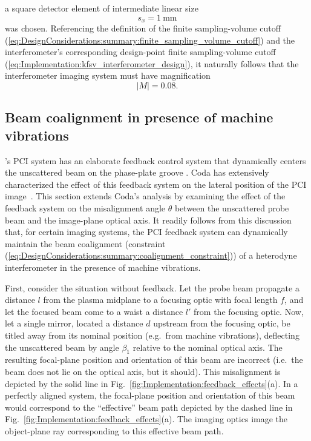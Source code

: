 a square detector element of intermediate linear size
\begin{equation}
  s_x = \SI{1}{\milli\meter}
  \label{eq:Implementation:detector_size}
\end{equation}
was chosen.
Referencing the definition of the finite sampling-volume cutoff
(\ref{eq:DesignConsiderations:summary:finite_sampling_volume_cutoff}) and
the interferometer's corresponding design-point
finite sampling-volume cutoff
(\ref{eq:Implementation:kfsv_interferometer_design}),
it naturally follows that the interferometer imaging system
must have magnification
\begin{equation}
  |M| = 0.08.
  \label{eq:Implementation:magnification_interferometer_design}
\end{equation}


\subsection{Beam coalignment in presence of machine vibrations}
\label{sec:Implementation:OpticalLayout:coalignment_with_feedback}
\diiid's PCI system has an elaborate feedback control system
that dynamically centers the unscattered beam on the phase-plate groove
\cite[Sec.~3.5]{coda_phd}.
Coda has extensively characterized the effect of this feedback system
on the lateral position of the PCI image~\cite[Sec.~3.5(f)]{coda_phd}.
This section extends Coda's analysis by examining
the effect of the feedback system on the misalignment angle $\theta$
between the unscattered probe beam and the image-plane optical axis.
It readily follows from this discussion that,
for certain imaging systems,
the PCI feedback system can dynamically maintain
the beam coalignment
(constraint (\ref{eq:DesignConsiderations:summary:coalignment_constraint}))
of a heterodyne interferometer in the presence of machine vibrations.

First, consider the situation without feedback.
Let the probe beam propagate a distance $l$
from the plasma midplane to a focusing optic with focal length $f$, and
let the focused beam come to a waist a distance $l'$ from the focusing optic.
Now, let a single mirror,
located a distance $d$ upstream from the focusing optic,
be titled away from its nominal position (e.g.\ from machine vibrations),
deflecting the unscattered beam by angle $\beta_1$
relative to the nominal optical axis.
The resulting focal-plane position and orientation of this beam are incorrect
(i.e.\ the beam does not lie on the optical axis, but it should).
This misalignment is depicted by the solid line in
Fig.~\ref{fig:Implementation:feedback_effects}(a).
In a perfectly aligned system,
the focal-plane position and orientation of this beam
would correspond to the ``effective'' beam path
depicted by the dashed line in
Fig.~\ref{fig:Implementation:feedback_effects}(a).
The imaging optics image the object-plane ray
corresponding to this effective beam path.

